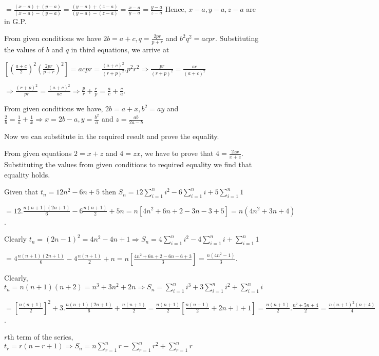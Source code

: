   $= \frac{(x - a) + (y - a)}{(x - a) - (y - a)} = \frac{(y - a) + (z - a)}{(y - a) - (z - a)} = \frac{x -
    a}{y - a} = \frac{y - a}{z - a}$
  Hence, $x - a, y - a, z - a$ are in G.P.
\item From given conditions we have $2b = a + c, q = \frac{2pr}{p + r}$ and $b^2q^2 = acpr$. Substituting
  the values of $b$ and $q$ in third equations, we arrive at

  $\left[\left(\frac{a + c}{2}\right)^2\left(\frac{2pr}{p + r}\right)^2\right] = acpr = \frac{(a + c)^2}{(r
    + p)^2}.p^2r^2 \Rightarrow \frac{pr}{(r + p)^2} = \frac{ac}{(a + c)^2}$

  $\Rightarrow \frac{(r + p)^2}{pr} = \frac{(a + c)^2}{ac} \Rightarrow \frac{p}{r} + \frac{r}{p} =
  \frac{a}{c} + \frac{c}{a}$.
\item From given conditions we have, $2b = a + x, b^2 = ay$ and $\frac{2}{b} = \frac{1}{a} + \frac{1}{x}
  \Rightarrow x = 2b - a, y = \frac{b^2}{a}$ and $z = \frac{ab}{2a - b}$

  Now we can substitute in the required result and prove the equality.
\item From given equations $2 = x + z$ and $4 = zx$, we have to prove that $4 = \frac{2zx}{x +
  z}$. Substituting the values from given conditions to required equality we find that equality holds.
\item Given that $t_n = 12n^2 - 6n + 5$ then $\displaystyle S_n = 12\sum_{i = 1}^ni^2 - 6\sum_{i=1}^ni + 5\sum_{i=1}^n1$

  $= 12.\frac{n(n + 1)(2n + 1)}{6} - 6\frac{n(n + 1)}{2} + 5n = n\left[4n^2 + 6n + 2 - 3n - 3 + 5\right]
  = n(4n^2 + 3n  + 4)$.
\item Clearly $t_n = (2n - 1)^2 = 4n^2 - 4n + 1 \Rightarrow \displaystyle S_n = 4\sum_{i =1}^ni^2 -
  4\sum_{i=1}^ni + \sum_{i=1}^n1$

  $= 4\frac{n(n + 1)(2n + 1)}{6}- 4\frac{n(n + 1)}{2} + n = n\left[\frac{4n^2 + 6n + 2 - 6n - 6 +
      3}{3}\right] = \frac{n(4n^2 -1)}{3}$.
\item Clearly, $t_n = n(n + 1)(n + 2) = n^3 + 3n^2 + 2n \Rightarrow \displaystyle S_n = \sum_{i= 1}^ni^3 +
  3\sum_{i=1}^n i^2 + \sum_{i=1}^ni$

  $= \left[\frac{n(n + 1)}{2}\right]^2 + 3.\frac{n(n + 1)(2n + 1)}{6} + \frac{n(n + 1)}{2} = \frac{n(n +
    1)}{2}\left[\frac{n(n + 1)}{2} + 2n + 1 + 1\right] = \frac{n(n + 1)}{2}.\frac{n^2 + 5n + 4}{2} =
  \frac{n(n + 1)^2(n + 4)}{4}$.
\item $r$th term of the series, $t_r = r(n - r + 1)\Rightarrow\displaystyle S_n = n\sum_{r=1}^nr -
  \sum_{r=1}^nr^2 + \sum_{r=1}^nr$

